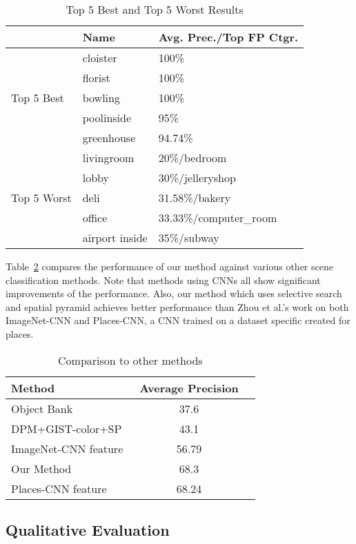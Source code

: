 \begin{table}[ht]
        \caption{Top 5 Best and Top 5 Worst Results}
        \centering
        \begin{tabular}{l l l}
        \hline \hline
        & Name           & Avg. Prec./Top FP Ctgr. \\ \hline
        \multirow{5}{*}{Top 5 Best}
        & cloister       & 100\% \\
        & florist        & 100\% \\
        & bowling        & 100\% \\
        & poolinside     & 95\% \\
        & greenhouse     & 94.74\% \\
        \hline
        \multirow{5}{*}{Top 5 Worst}
        & livingroom     & 20\%/bedroom \\
        & lobby          & 30\%/jelleryshop \\
        & deli           & 31.58\%/bakery \\
        & office         & 33.33\%/computer\_room \\
        & airport inside & 35\%/subway \\
        \hline
        \end{tabular}
        \label{tab:overall}
\end{table}

Table~\ref{tab:compare} compares the performance of our method against various other scene classification methods. Note that methods using CNNs all show significant improvements of the performance.
Also, our method which uses selective search and spatial pyramid achieves better performance than Zhou et al.'s work on both ImageNet-CNN and Places-CNN, a CNN trained on a dataset specific created for places.

\begin{table}[ht]
        \caption{Comparison to other methods}
        \centering
        \begin{tabular}{l c c}
        \hline \hline
        Method                & Average Precision \\ \hline
        Object Bank~\protect\cite{Li:2010:OBA} & 37.6 \\
        DPM+GIST-color+SP~\protect\cite{Pandey:2011:SRW} & 43.1 \\
        ImageNet-CNN feature~\protect\cite{Zhou:2014:LDF} & 56.79 \\
        Our Method & 68.3 \\
        Places-CNN feature~\protect\cite{Zhou:2014:LDF} & 68.24 \\
        \hline
        \end{tabular}
        \label{tab:compare}
\end{table}

\subsection{Qualitative Evaluation}
